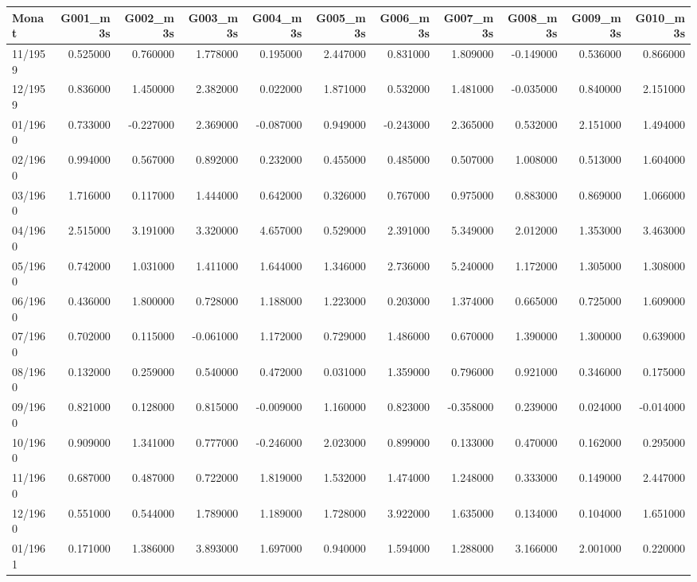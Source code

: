\begin{tabular}{lrrrrrrrrrr}
\toprule
Monat & G001_m3s & G002_m3s & G003_m3s & G004_m3s & G005_m3s & G006_m3s & G007_m3s & G008_m3s & G009_m3s & G010_m3s \\
\midrule
11/1959 & 0.525000 & 0.760000 & 1.778000 & 0.195000 & 2.447000 & 0.831000 & 1.809000 & -0.149000 & 0.536000 & 0.866000 \\
12/1959 & 0.836000 & 1.450000 & 2.382000 & 0.022000 & 1.871000 & 0.532000 & 1.481000 & -0.035000 & 0.840000 & 2.151000 \\
01/1960 & 0.733000 & -0.227000 & 2.369000 & -0.087000 & 0.949000 & -0.243000 & 2.365000 & 0.532000 & 2.151000 & 1.494000 \\
02/1960 & 0.994000 & 0.567000 & 0.892000 & 0.232000 & 0.455000 & 0.485000 & 0.507000 & 1.008000 & 0.513000 & 1.604000 \\
03/1960 & 1.716000 & 0.117000 & 1.444000 & 0.642000 & 0.326000 & 0.767000 & 0.975000 & 0.883000 & 0.869000 & 1.066000 \\
04/1960 & 2.515000 & 3.191000 & 3.320000 & 4.657000 & 0.529000 & 2.391000 & 5.349000 & 2.012000 & 1.353000 & 3.463000 \\
05/1960 & 0.742000 & 1.031000 & 1.411000 & 1.644000 & 1.346000 & 2.736000 & 5.240000 & 1.172000 & 1.305000 & 1.308000 \\
06/1960 & 0.436000 & 1.800000 & 0.728000 & 1.188000 & 1.223000 & 0.203000 & 1.374000 & 0.665000 & 0.725000 & 1.609000 \\
07/1960 & 0.702000 & 0.115000 & -0.061000 & 1.172000 & 0.729000 & 1.486000 & 0.670000 & 1.390000 & 1.300000 & 0.639000 \\
08/1960 & 0.132000 & 0.259000 & 0.540000 & 0.472000 & 0.031000 & 1.359000 & 0.796000 & 0.921000 & 0.346000 & 0.175000 \\
09/1960 & 0.821000 & 0.128000 & 0.815000 & -0.009000 & 1.160000 & 0.823000 & -0.358000 & 0.239000 & 0.024000 & -0.014000 \\
10/1960 & 0.909000 & 1.341000 & 0.777000 & -0.246000 & 2.023000 & 0.899000 & 0.133000 & 0.470000 & 0.162000 & 0.295000 \\
11/1960 & 0.687000 & 0.487000 & 0.722000 & 1.819000 & 1.532000 & 1.474000 & 1.248000 & 0.333000 & 0.149000 & 2.447000 \\
12/1960 & 0.551000 & 0.544000 & 1.789000 & 1.189000 & 1.728000 & 3.922000 & 1.635000 & 0.134000 & 0.104000 & 1.651000 \\
01/1961 & 0.171000 & 1.386000 & 3.893000 & 1.697000 & 0.940000 & 1.594000 & 1.288000 & 3.166000 & 2.001000 & 0.220000 \\

\end{tabular}
